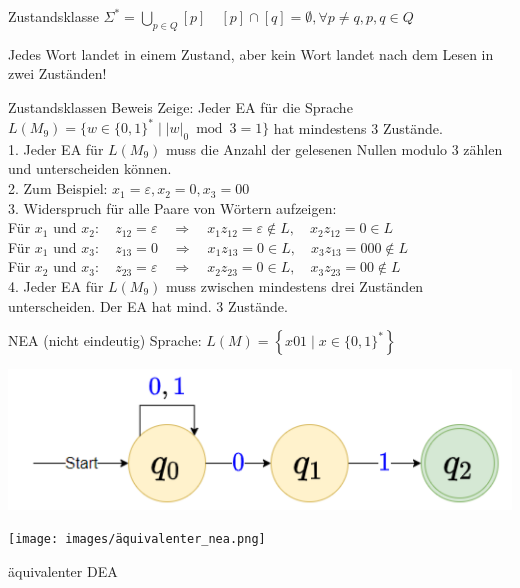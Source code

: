 \begin{definition}{Zustandsklasse}
    $\Sigma^{*}=\bigcup_{p \in Q}[p] \quad [p] \cap[q]=\emptyset, \forall p \neq q, p, q \in Q$

    Jedes Wort landet in einem Zustand, aber kein Wort landet nach dem Lesen in zwei Zuständen!
\end{definition}

\begin{KR}{Zustandsklassen Beweis}
    Zeige: Jeder EA für die Sprache $L(M_9)=\{w \in\{0,1\}^{*} \mid| w|_{0} \bmod 3=1\}$ hat mindestens 3 Zustände.\\
    1. Jeder EA für $L\left(M_9\right)$ muss die Anzahl der gelesenen Nullen modulo 3 zählen und unterscheiden können.\\
    2. Zum Beispiel: $x_1=\varepsilon, x_2=0, x_3=00$\\
    3. Widerspruch für alle Paare von Wörtern aufzeigen:\\
    Für $x_1$ und $x_2: \quad z_{12}=\varepsilon \quad \Rightarrow \quad x_1 z_{12}=\varepsilon \notin L, \quad x_2 z_{12}=0 \in L$\\
    Für $x_1$ und $x_3: \quad z_{13}=0 \quad \Rightarrow \quad x_1 z_{13}=0 \in L, \quad x_3 z_{13}=000 \notin L$\\
    Für $x_2$ und $x_3: \quad z_{23}=\varepsilon \quad \Rightarrow \quad x_2 z_{23}=0 \in L, \quad x_3 z_{23}=00 \notin L$\\
    4. Jeder EA für $L\left(M_9\right)$ muss zwischen mindestens drei Zuständen unterscheiden. Der EA hat mind. 3 Zustände.
\end{KR}

\begin{example2}{NEA (nicht eindeutig)} Sprache: $L(M)=\left\{x 01 \mid x \in\{0,1\}^{*}\right\}$
    
    \begin{minipage}{0.5\linewidth}
        \includegraphics[width=1\linewidth]{images/nea_example1.png}
    \end{minipage}
    \hspace{1mm}
    \begin{minipage}{0.5\linewidth}
        \begin{center}
        \texttt{[image: images/äquivalenter\_nea.png]}
        
        {\footnotesize äquivalenter DEA}
        \end{center}
    \end{minipage}    
\end{example2}



